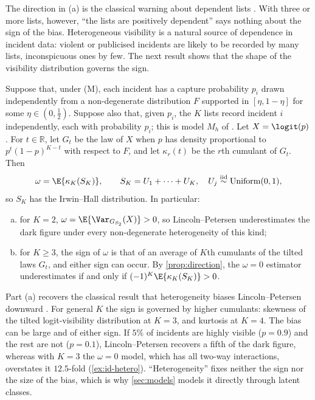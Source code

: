 The direction in (a) is the classical warning about dependent lists \citep{international1995,wolter1986}. With three or more lists, however, ``the lists are positively dependent'' says nothing about the sign of the bias. Heterogeneous visibility is a natural source of dependence in incident data: violent or publicised incidents are likely to be recorded by many lists, inconspicuous ones by few. The next result shows that the shape of the visibility distribution governs the sign.

\begin{proposition}\label{prop:id-hetero}
Suppose that, under (M), each incident has a capture probability $p_i$ drawn independently from a non-degenerate distribution $F$ supported in $[\eta,1-\eta]$ for some $\eta\in(0,\tfrac12)$. Suppose also that, given $p_i$, the $K$ lists record incident $i$ independently, each with probability $p_i$; this is model $M_h$ of \citet{otis1978}. Let $X=\logit(p)$. For $t\in\mathbb R$, let $G_t$ be the law of $X$ when $p$ has density proportional to $p^t(1-p)^{K-t}$ with respect to $F$, and let $\kappa_r(t)$ be the $r$th cumulant of $G_t$. Then
\begin{equation}\label{eq:id-irwinhall}
  \omega=\E\{\kappa_K(S_K)\},\qquad S_K=U_1+\dots+U_K,\quad U_j\overset{\mathrm{iid}}{\sim}\mathrm{Uniform}(0,1),
\end{equation}
so $S_K$ has the Irwin--Hall distribution. In particular:
\begin{enumerate}[(a)]
  \item for $K=2$, $\omega=\E\{\Var_{G_{S_2}}(X)\}>0$, so Lincoln--Petersen underestimates the dark figure under every non-degenerate heterogeneity of this kind;
  \item for $K\ge3$, the sign of $\omega$ is that of an average of $K$th cumulants of the tilted laws $G_t$, and either sign can occur. By \cref{prop:direction}, the $\omega=0$ estimator underestimates if and only if $(-1)^K\E\{\kappa_K(S_K)\}>0$.
\end{enumerate}
\end{proposition}

Part (a) recovers the classical result that heterogeneity biases Lincoln--Petersen downward \citep{international1995,chao2001}. For general $K$ the sign is governed by higher cumulants: skewness of the tilted logit-visibility distribution at $K=3$, and kurtosis at $K=4$. The bias can be large and of either sign. If $5\%$ of incidents are highly visible ($p=0.9$) and the rest are not ($p=0.1$), Lincoln--Petersen recovers a fifth of the dark figure, whereas with $K=3$ the $\omega=0$ model, which has all two-way interactions, overstates it $12.5$-fold (\cref{ex:id-hetero}). ``Heterogeneity'' fixes neither the sign nor the size of the bias, which is why \cref{sec:models} models it directly through latent classes.

